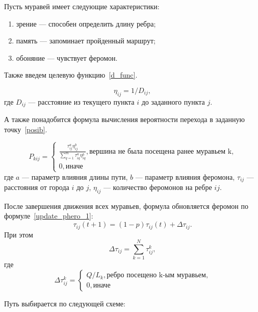 Пусть муравей имеет следующие характеристики:
\begin{enumerate}[label=\arabic*)]
	\item зрение --- способен определить длину ребра;
	\item память --- запоминает пройденный маршрут;
	\item обоняние --- чувствует феромон.
\end{enumerate}

Также введем целевую функцию~\eqref{d_func}.

\begin{equation}
	\label{d_func}
	\eta_{ij} = 1 / D_{ij},
\end{equation}
где $D_{ij}$ — расстояние из текущего пункта $i$ до заданного пункта $j$.

А также понадобится формула вычисления вероятности перехода в заданную точку~\eqref{posib}.

\begin{equation}
	\label{posib}
	P_{kij} = \begin{cases}
		\frac{\tau_{ij}^a\eta_{ij}^b}{\sum_{q=1}^m \tau^a_{iq}\eta^b_{iq}}, \textrm{вершина не была посещена ранее муравьем k,} \\
		0, \textrm{иначе}
	\end{cases}
\end{equation}
где $a$ --- параметр влияния длины пути, $b$ --- параметр влияния феромона, $\tau_{ij}$ --- расстояния от города $i$ до $j$, $\eta_{ij}$ --- количество феромонов на ребре $ij$.

После завершения движения всех муравьев, формула обновляется феромон по формуле~\eqref{update_phero_1}:
\begin{equation}
	\label{update_phero_1}
		\tau_{ij}(t+1) = (1-p)\tau_{ij}(t) + \Delta \tau_{ij}.
\end{equation}
При этом
\begin{equation}
\label{update_phero_2}
 \Delta \tau_{ij} = \sum_{k=1}^N \tau^k_{ij},
\end{equation}
где
\begin{equation}
	\label{update_phero_3}
		 \Delta\tau^k_{ij} = \begin{cases}
		Q/L_{k}, \textrm{ребро посещено k-ым муравьем,} \\
		0, \textrm{иначе}
	\end{cases}
\end{equation}

Путь выбирается по следующей схеме:

